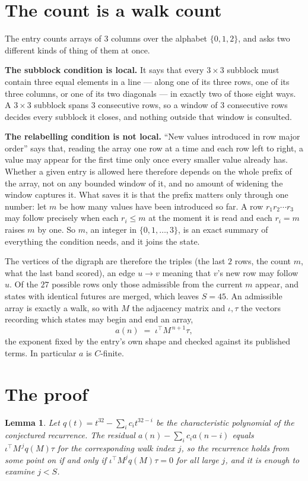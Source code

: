 \documentclass[11pt,a4paper]{article}
\theoremstyle{plain}
\newtheorem{lemma}[theorem]{Lemma}
\theoremstyle{definition}
\begin{document}
\section{The count is a walk count}

The entry counts arrays of 3 columns over the alphabet $\{0,1,2\}$, and asks two different kinds of thing of them at once.

\textbf{The subblock condition is local.} It says that every $3\times3$ subblock must contain three equal elements in a line --- along one of its three rows, one of its three columns, or one of its two diagonals --- in exactly two of those eight ways. A $ 3\times3$ subblock spans $3$ consecutive rows, so a window of $3$ consecutive rows decides every subblock it closes, and nothing outside that window is consulted.

\textbf{The relabelling condition is not local.} ``New values introduced in row major order'' says that, reading the array one row at a time and each row left to right, a value may appear for the first time only once every smaller value already has. Whether a given entry is allowed here therefore depends on the whole prefix of the array, not on any bounded window of it, and no amount of widening the window captures it. What saves it is that the prefix matters only through one number: let $m$ be how many values have been introduced so far. A row $r_1r_2\cdots r_3$ may follow precisely when each $r_i\le m$ at the moment it is read and each $r_i=m$ raises $m$ by one. So $m$, an integer in $\{0,1,\dots,3\}$, is an exact summary of everything the condition needs, and it joins the state.

The vertices of the digraph are therefore the triples (the last $2$ rows, the count $m$, what the last band scored), an edge $u\to v$ meaning that $v$'s new row may follow $u$. Of the $27$ possible rows only those admissible from the current $m$ appear, and states with identical futures are merged, which leaves $S=45$. An admissible array is exactly a walk, so with $M$ the adjacency matrix and $\iota,\tau$ the vectors recording which states may begin and end an array,
\[
a(n)\;=\;\iota^{\!\top}M^{\,n+1}\tau ,
\]
the exponent fixed by the entry's own shape and checked against its published terms. In
particular $a$ is $C$-finite.

\section{The proof}

\begin{lemma}\label{lem:crit}
Let $q(t)=t^{32}-\sum_i c_it^{32-i}$ be the characteristic polynomial of the
conjectured recurrence. The residual $a(n)-\sum_ic_ia(n-i)$ equals
$\iota^{\!\top}M^{\,j}q(M)\tau$ for the corresponding walk index $j$, so the recurrence
holds from some point on if and only if $\iota^{\!\top}M^{j}q(M)\tau=0$ for all large $j$,
and it is enough to examine $j<S$.
\end{lemma}
\end{document}
